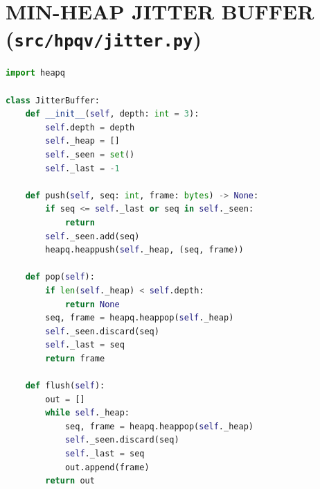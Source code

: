 \section{MIN-HEAP JITTER BUFFER (\texttt{src/hpqv/jitter.py})}
\begin{lstlisting}[language=Python]
import heapq

class JitterBuffer:
    def __init__(self, depth: int = 3):
        self.depth = depth
        self._heap = []
        self._seen = set()
        self._last = -1

    def push(self, seq: int, frame: bytes) -> None:
        if seq <= self._last or seq in self._seen:
            return
        self._seen.add(seq)
        heapq.heappush(self._heap, (seq, frame))

    def pop(self):
        if len(self._heap) < self.depth:
            return None
        seq, frame = heapq.heappop(self._heap)
        self._seen.discard(seq)
        self._last = seq
        return frame

    def flush(self):
        out = []
        while self._heap:
            seq, frame = heapq.heappop(self._heap)
            self._seen.discard(seq)
            self._last = seq
            out.append(frame)
        return out
\end{lstlisting}
